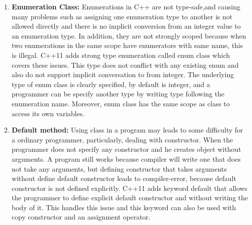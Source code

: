\documentclass[11pt,]{report}
\begin{document}
\begin{enumerate}
\item  \textbf{Enumeration Class:} Enumerations in C++ are not type-safe,\linebreak and causing many problems such as assigning one enumeration type to another is not allowed directly and there is no implicit conversion from an integer value to an enumeration type. In addition, they are not strongly scoped because when two enumerations in the same scope have \linebreak enumerators with same name, this is illegal. C++11 adds strong type enumeration called enum class which covers these issues. This type does not conflict with any existing enum and also do not support implicit \linebreak conversation to from integer. The underlying type of enum class is clearly specified, by default is integer, and a programmer can be specify another type by writing type following the enumeration name. Moreover, enum class has the same scope as class to access its own variables\cite{Gregorie:professionalcpp}.
\newpage
\item \textbf{Default method:} Using class in a program may leads to some \linebreak difficulty for a ordinary programmer, particularly, dealing with \linebreak constructor. When the programmer does not specify any constructor and he creates object without arguments. A program still works \linebreak because compiler will write one that does not take any arguments, but \linebreak defining \linebreak constructor that takes arguments without define default constructor leads to compiler-error, because default constructor is not defined explicitly. C++11 adds keyword default that allows the programmer to define \linebreak explicit default constructor and without writing the body of it. This \linebreak handles this issue and this keyword can also be used with copy \linebreak constructor and an assignment operator\cite{Gregorie:professionalcpp}. 


\end{enumerate}
\end{document}
